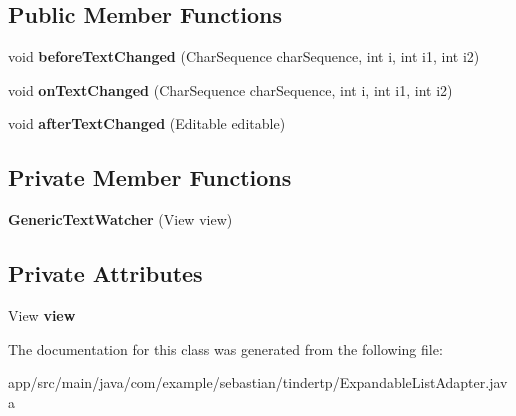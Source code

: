 \subsection*{Public Member Functions}
\begin{DoxyCompactItemize}
\item 
void {\bfseries before\+Text\+Changed} (Char\+Sequence char\+Sequence, int i, int i1, int i2)\hypertarget{classcom_1_1example_1_1sebastian_1_1tindertp_1_1ExpandableListAdapter_1_1GenericTextWatcher_ae1a15a253d83a19e2e4052fee5f14429}{}\label{classcom_1_1example_1_1sebastian_1_1tindertp_1_1ExpandableListAdapter_1_1GenericTextWatcher_ae1a15a253d83a19e2e4052fee5f14429}

\item 
void {\bfseries on\+Text\+Changed} (Char\+Sequence char\+Sequence, int i, int i1, int i2)\hypertarget{classcom_1_1example_1_1sebastian_1_1tindertp_1_1ExpandableListAdapter_1_1GenericTextWatcher_a71b14779fd348e060f985416b746db25}{}\label{classcom_1_1example_1_1sebastian_1_1tindertp_1_1ExpandableListAdapter_1_1GenericTextWatcher_a71b14779fd348e060f985416b746db25}

\item 
void {\bfseries after\+Text\+Changed} (Editable editable)\hypertarget{classcom_1_1example_1_1sebastian_1_1tindertp_1_1ExpandableListAdapter_1_1GenericTextWatcher_a991b14a73e2d62d2b66dd1155855fc1e}{}\label{classcom_1_1example_1_1sebastian_1_1tindertp_1_1ExpandableListAdapter_1_1GenericTextWatcher_a991b14a73e2d62d2b66dd1155855fc1e}

\end{DoxyCompactItemize}
\subsection*{Private Member Functions}
\begin{DoxyCompactItemize}
\item 
{\bfseries Generic\+Text\+Watcher} (View view)\hypertarget{classcom_1_1example_1_1sebastian_1_1tindertp_1_1ExpandableListAdapter_1_1GenericTextWatcher_af5cb88f6d47a15ef233287f1ce908fcc}{}\label{classcom_1_1example_1_1sebastian_1_1tindertp_1_1ExpandableListAdapter_1_1GenericTextWatcher_af5cb88f6d47a15ef233287f1ce908fcc}

\end{DoxyCompactItemize}
\subsection*{Private Attributes}
\begin{DoxyCompactItemize}
\item 
View {\bfseries view}\hypertarget{classcom_1_1example_1_1sebastian_1_1tindertp_1_1ExpandableListAdapter_1_1GenericTextWatcher_a87552429af26d0d799095b4ed75d3f78}{}\label{classcom_1_1example_1_1sebastian_1_1tindertp_1_1ExpandableListAdapter_1_1GenericTextWatcher_a87552429af26d0d799095b4ed75d3f78}

\end{DoxyCompactItemize}


The documentation for this class was generated from the following file\+:\begin{DoxyCompactItemize}
\item 
app/src/main/java/com/example/sebastian/tindertp/Expandable\+List\+Adapter.\+java\end{DoxyCompactItemize}
